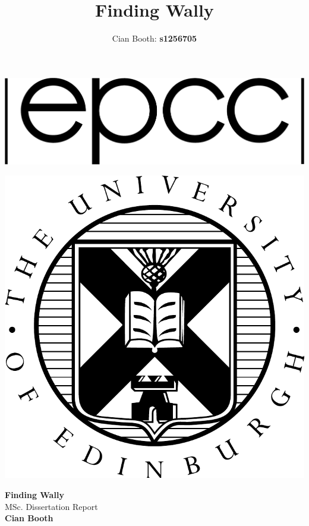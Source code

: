 \documentclass[a4paper,12pt]{article}
\author{Cian Booth: \textbf{s1256705}}
\title{Finding Wally}
\def\biblio {
  
  
}
\begin{document}
  \def\biblio{}
  \begin{minipage}{0.75\textwidth}
    \resizebox{72pt}{!} {
      \includegraphics{logos/logo_black}
    }
  \end{minipage}
  \begin{minipage}{0.2\textwidth}
    \resizebox{72pt}{!} {
      \includegraphics{logos/eucrest}
    }
  \end{minipage}
  \begin{center}
    \textbf{\Huge Finding Wally}\\
    {\Large MSc. Dissertation Report}\\
    \vfill
    {\huge \textbf{Cian Booth}}\\
    \vspace{1em}
  \end{center}
  \pagebreak
  \tableofcontents
  \pagebreak
  
  \pagebreak
  
  
\end{document}
